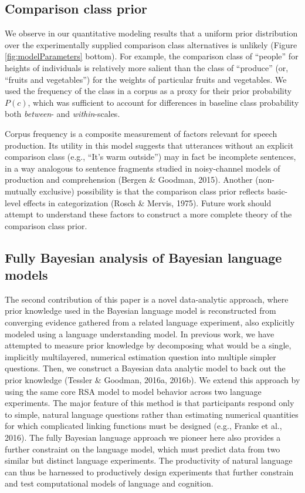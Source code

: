\documentclass[doc]{apa6}
\begin{document}
\subsection{Comparison class prior}

We observe in our quantitative modeling results that a uniform prior
distribution over the experimentally supplied comparison class
alternatives is unlikely (Figure \ref{fig:modelParameters} bottom). For
example, the comparison class of ``people'' for heights of
individuals is relatively more salient than the class of
``produce'' (or, ``fruits and vegetables'') for the weights
of particular fruits and vegetables. We used the frequency of the class
in a corpus as a proxy for their prior probability \(P(c)\), which was
sufficient to account for differences in baseline class probability both
\emph{between}- and \emph{within}-scales.

Corpus frequency is a composite measurement of factors relevant for
speech production. Its utility in this model suggests that utterances
without an explicit comparison class (e.g., ``It's warm outside'')
may in fact be incomplete sentences, in a way analogous to sentence
fragments studied in noisy-channel models of production and
comprehension (Bergen \& Goodman, 2015). Another (non-mutually
exclusive) possibility is that the comparison class prior reflects
basic-level effects in categorization (Rosch \& Mervis, 1975). Future
work should attempt to understand these factors to construct a more
complete theory of the comparison class prior.

\subsection{Fully Bayesian analysis of Bayesian language
models}

The second contribution of this paper is a novel data-analytic approach,
where prior knowledge used in the Bayesian language model is
reconstructed from converging evidence gathered from a related language
experiment, also explicitly modeled using a language understanding
model. In previous work, we have attempted to measure prior knowledge by
decomposing what would be a single, implicitly multilayered, numerical
estimation question into multiple simpler questions. Then, we construct
a Bayesian data analytic model to back out the prior knowledge (Tessler
\& Goodman, 2016a, 2016b). We extend this approach by using the same
core RSA model to model behavior across two language experiments. The
major feature of this method is that participants respond only to
simple, natural language questions rather than estimating numerical
quantities for which complicated linking functions must be designed
(e.g., Franke et al., 2016). The fully Bayesian language approach we
pioneer here also provides a further constraint on the language model,
which must predict data from two similar but distinct language
experiments. The productivity of natural language can thus be harnessed
to productively design experiments that further constrain and test
computational models of language and cognition.
\end{document}
